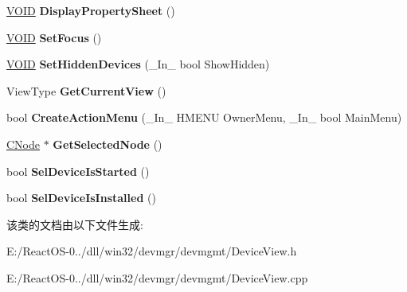 \begin{DoxyCompactItemize}
\item 
\mbox{\label{class_c_device_view_a403da4f331042f02e1283007a1918ea5}} 
\hyperlink{interfacevoid}{V\+O\+ID} {\bfseries Display\+Property\+Sheet} ()
\item 
\mbox{\label{class_c_device_view_a6135ea5fdb433d6709d090d5be9b72c3}} 
\hyperlink{interfacevoid}{V\+O\+ID} {\bfseries Set\+Focus} ()
\item 
\mbox{\label{class_c_device_view_a218e3baa891900dee0315c12fdbeed00}} 
\hyperlink{interfacevoid}{V\+O\+ID} {\bfseries Set\+Hidden\+Devices} (\+\_\+\+In\+\_\+ bool Show\+Hidden)
\item 
\mbox{\label{class_c_device_view_a92e070a1a01bb8e942219ff56d6570df}} 
View\+Type {\bfseries Get\+Current\+View} ()
\item 
\mbox{\label{class_c_device_view_aeaf028fe85ea593c591db435357142d4}} 
bool {\bfseries Create\+Action\+Menu} (\+\_\+\+In\+\_\+ H\+M\+E\+NU Owner\+Menu, \+\_\+\+In\+\_\+ bool Main\+Menu)
\item 
\mbox{\label{class_c_device_view_a2c352c10e091de3605d30c3f2c17f187}} 
\hyperlink{class_c_node}{C\+Node} $\ast$ {\bfseries Get\+Selected\+Node} ()
\item 
\mbox{\label{class_c_device_view_a653e3fdc869dc17f00fefa07128adb67}} 
bool {\bfseries Sel\+Device\+Is\+Started} ()
\item 
\mbox{\label{class_c_device_view_ae9f828774fcf7f50a816f6a3f7883284}} 
bool {\bfseries Sel\+Device\+Is\+Installed} ()
\end{DoxyCompactItemize}


该类的文档由以下文件生成\+:\begin{DoxyCompactItemize}
\item 
E\+:/\+React\+O\+S-\/0../dll/win32/devmgr/devmgmt/Device\+View.\+h\item 
E\+:/\+React\+O\+S-\/0../dll/win32/devmgr/devmgmt/Device\+View.\+cpp\end{DoxyCompactItemize}

